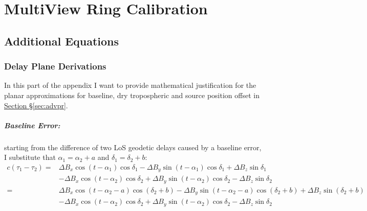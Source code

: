 
\chapter[MultiView Additional]{MultiView Ring Calibration}

\section{Additional Equations}
	\subsection{Delay Plane Derivations}
		In this part of the appendix I want to provide mathematical justification for the planar approximations for baseline, dry tropospheric and source position offset in \hyperref[sec:advpr]{Section \S\ref*{sec:advpr}}.
		
		\paragraph{Baseline Error:} \label{app:baselineerror} starting from the difference of two LoS geodetic delays caused by a baseline error, I substitute that $\alpha_1 = \alpha_2+a$ and $\delta_1=\delta_2+b$:
	\begin{equation*}
	\begin{split}
	c(\tau_1-\tau_2) =& \Delta B_x\cos(t-\alpha_1)\cos\delta_1 - \Delta B_y\sin(t-\alpha_1)\cos\delta_1 + \Delta B_z\sin\delta_1 \\
	                 &- \Delta B_x\cos(t-\alpha_2)\cos\delta_2 + \Delta B_y\sin(t-\alpha_2)\cos\delta_2 - \Delta B_z\sin\delta_2 \\
	                 =& \Delta B_x\cos(t-\alpha_2-a)\cos\left(\delta_2+b\right) - \Delta B_y\sin(t-\alpha_2-a)\cos\left(\delta_2+b\right) + \Delta B_z\sin\left(\delta_2+b\right) \\
					 &- \Delta B_x\cos(t-\alpha_2)\cos\delta_2 + \Delta B_y\sin(t-\alpha_2)\cos\delta_2 - \Delta B_z\sin\delta_2
	\end{split}
	\end{equation*} 

